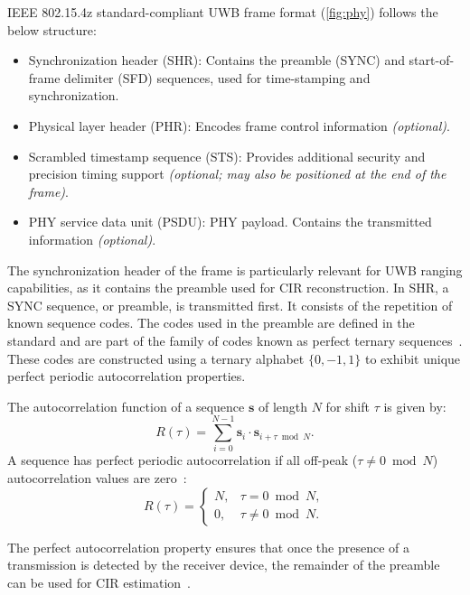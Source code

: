 IEEE 802.15.4z standard-compliant UWB frame format (\autoref{fig:phy}) follows the below structure:

\begin{itemize} 
    \item Synchronization header (SHR): Contains the preamble (SYNC) and start-of-frame delimiter (SFD) sequences, used for time-stamping and synchronization. 
    \item Physical layer header (PHR): Encodes frame control information \emph{(optional)}. 
    \item Scrambled timestamp sequence (STS): Provides additional security and precision timing support \emph{(optional; may also be positioned at the end of the frame)}. 
    \item PHY service data unit (PSDU): PHY payload. Contains the transmitted information \emph{(optional)}. 
\end{itemize}

The synchronization header of the frame is particularly relevant for UWB ranging capabilities, as it contains the preamble used for CIR reconstruction. In SHR, a SYNC sequence, or preamble, is transmitted first. It consists of the repetition of known sequence codes. The codes used in the preamble are defined in the standard and are part of the family of codes known as perfect ternary sequences~\cite{mcelroy2014comparison}. These codes are constructed using a ternary alphabet $\{0, -1, 1\}$ to exhibit unique perfect periodic autocorrelation properties. 

The autocorrelation function of a sequence $\bm s$ of length $N$ for shift $\tau$ is given by:
\begin{equation}
R(\tau) = \sum_{i=0}^{N-1} \bm s_i \cdot \bm s_{i+\tau \bmod N}.
\end{equation}
A sequence has perfect periodic autocorrelation if all off-peak ($\tau \ne 0 \bmod N$) autocorrelation values are zero~\cite{blake2014construction}:
\begin{equation}
R(\tau) =
\begin{cases}
    N, & \tau = 0 \bmod N,\\
    0, & \tau \neq 0 \bmod N.
\end{cases}
\end{equation}

The perfect autocorrelation property ensures that once the presence of a transmission is detected by the receiver device, the remainder of the preamble can be used for CIR estimation~\cite{mcelroy2014comparison}.

